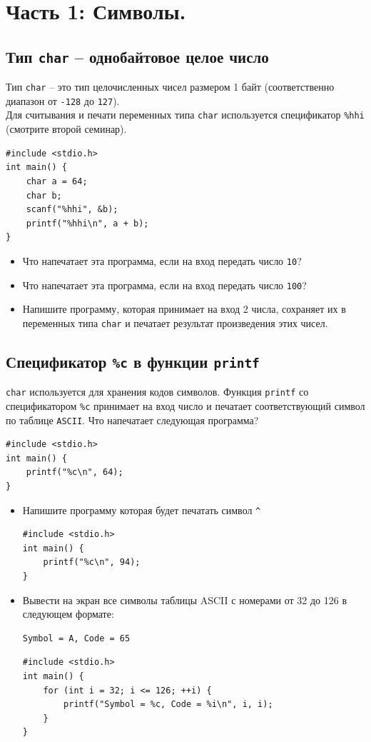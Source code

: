 \documentclass{article}
\begin{document}
\section*{Часть 1: Символы.}
\subsection*{Тип \texttt{char} -- однобайтовое целое число}
Тип \texttt{char} -- это тип целочисленных чисел размером 1 байт (соответственно диапазон от \texttt{-128} до \texttt{127}).\\
Для считывания и печати переменных типа \texttt{char} используется спецификатор \texttt{\%hhi} (смотрите второй семинар).
\begin{lstlisting}
#include <stdio.h>
int main() {
    char a = 64;
    char b;
    scanf("%hhi", &b);
    printf("%hhi\n", a + b);
}
\end{lstlisting}
\begin{itemize}
\item Что напечатает эта программа, если на вход передать число \texttt{10}?
\item Что напечатает эта программа, если на вход передать число \texttt{100}?
\item Напишите программу, которая принимает на вход 2 числа, сохраняет их в переменных типа \texttt{char} и печатает результат произведения этих чисел.
\end{itemize}

\subsection*{Спецификатор \texttt{\%c} в функции \texttt{printf}}
\texttt{char} используется для хранения кодов символов. Функция \texttt{printf} со спецификатором \texttt{\%c} принимает на вход число и печатает соответствующий символ по таблице \texttt{ASCII}. Что напечатает следующая программа?
\begin{lstlisting}
#include <stdio.h>
int main() {
    printf("%c\n", 64);
}
\end{lstlisting}
\begin{itemize}
\item Напишите программу которая будет печатать символ \texttt{\^}
\begin{lstlisting}[backgroundcolor = \color{solcolor}]
#include <stdio.h>
int main() {
    printf("%c\n", 94);
}
\end{lstlisting}
\item Вывести на экран все символы таблицы ASCII с номерами от 32 до 126 в следующем формате: 
\begin{lstlisting}
Symbol = A, Code = 65
\end{lstlisting}
\begin{lstlisting}[backgroundcolor = \color{solcolor}]
#include <stdio.h>
int main() {
    for (int i = 32; i <= 126; ++i) {
        printf("Symbol = %c, Code = %i\n", i, i);
    }
}

\end{lstlisting}
\end{itemize}
\end{document}
